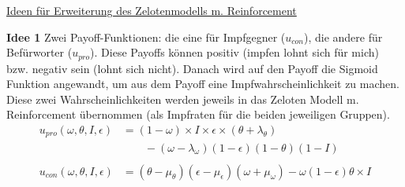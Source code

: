 \documentclass[10pt,a4paper]{article}
\begin{document}
	\begin{center}
		\underline{Ideen für Erweiterung des Zelotenmodells m. Reinforcement}
	\end{center}
\textbf{Idee 1}\newline
Zwei Payoff-Funktionen: die eine für Impfgegner ($u_{con}$), die andere für Befürworter ($u_{pro}$). Diese Payoffs können positiv (impfen lohnt sich für mich) bzw. negativ sein (lohnt sich nicht). Danach wird auf den Payoff die Sigmoid Funktion angewandt, um aus dem Payoff eine Impfwahrscheinlichkeit zu machen. Diese zwei Wahrscheinlichkeiten werden jeweils in das Zeloten Modell m. Reinforcement übernommen (als Impfraten für die beiden jeweiligen Gruppen).
	\begin{align*}
		u_{pro}(\omega, \theta, I, \epsilon) &= (1-\omega) \times I \times \epsilon \times (\theta + \lambda_{\theta}) \\
		&\qquad - (\omega - \lambda_{\omega})(1-\epsilon)(1-\theta)(1-I)\\
	&\\
		u_{con}(\omega, \theta, I, \epsilon) &= (\theta - \mu_{\theta})(\epsilon - \mu_{\epsilon})(\omega + \mu_{\omega}) - \omega(1-\epsilon)\theta \times I
	\end{align*}
	
\end{document}
